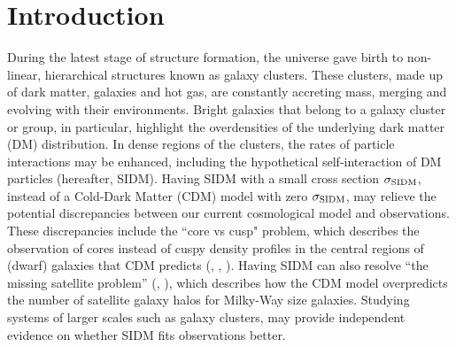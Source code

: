 \section{Introduction} 
During the latest stage of structure formation, the universe gave birth to
non-linear, hierarchical structures known as galaxy clusters. 
These clusters, made up of dark matter, galaxies and hot gas,
are constantly accreting mass, merging and evolving with their
environments. Bright galaxies that belong to a galaxy cluster or group, in 
particular, highlight the overdensities of the underlying dark matter (DM) 
distribution. In dense regions of the clusters, the rates of particle
interactions may be enhanced, including the hypothetical self-interaction of DM
particles (hereafter, SIDM). Having SIDM with a small cross section
$\sigma_{\rm SIDM}$, instead of a Cold-Dark Matter (CDM) model with zero $\sigma_{\rm
SIDM}$, 
may relieve the potential discrepancies 
between our current cosmological model and observations. These discrepancies include the 
``core vs cusp" problem, which describes the observation of cores instead of
cuspy density profiles in the central regions of
(dwarf) galaxies that CDM predicts (\citealt{Rocha2013a},
\citealt{Peter2013b}, \citealt{Buckley2014}). Having SIDM can also resolve 
``the missing satellite problem'' (\citealt{Moore1999}, \citealt{Klypin1999}),
which describes how the CDM model 
overpredicts the number of satellite galaxy halos for Milky-Way size galaxies. 
Studying systems of larger scales such as galaxy clusters, may provide independent 
evidence on whether SIDM fits observations better. 

